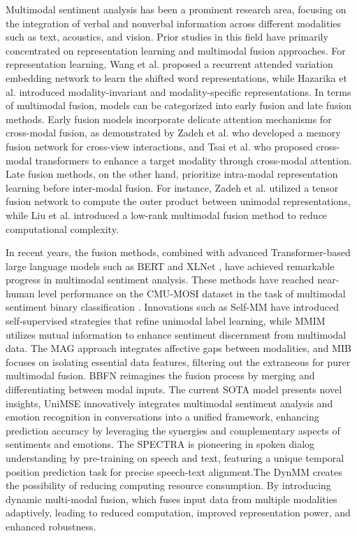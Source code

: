 \documentclass{article} %
\begin{document}
Multimodal sentiment analysis has been a prominent research area, focusing on the integration of verbal and nonverbal information across different modalities such as text, acoustics, and vision. Prior studies in this field have primarily concentrated on representation learning and multimodal fusion approaches. For representation learning, Wang et al. \citep{wang2019words} proposed a recurrent attended variation embedding network to learn the shifted word representations, while Hazarika et al. \citep{hazarika2020misa} introduced modality-invariant and modality-specific representations. In terms of multimodal fusion, models can be categorized into early fusion and late fusion methods. Early fusion models incorporate delicate attention mechanisms for cross-modal fusion, as demonstrated by Zadeh et al. \citep{zadeh2018memory} who developed a memory fusion network for cross-view interactions, and Tsai et al. \citep{tsai2019multimodal} who proposed cross-modal transformers to enhance a target modality through cross-modal attention. Late fusion methods, on the other hand, prioritize intra-modal representation learning before inter-modal fusion. For instance, Zadeh et al. \citep{zadeh2017tensor} utilized a tensor fusion network to compute the outer product between unimodal representations, while Liu et al. \citep{liu2018efficient} introduced a low-rank multimodal fusion method to reduce computational complexity.

In recent years, the fusion methods, combined with advanced Transformer-based large language models such as BERT \citep{devlin2018bert} and XLNet \citep{yang2019xlnet}, have achieved remarkable progress in multimodal sentiment analysis. These methods have reached near-human level performance on the CMU-MOSI dataset in the task of multimodal sentiment binary classification \citep{rahman2020integrating}. Innovations such as Self-MM \citep{yu2021learning} have introduced self-supervised strategies that refine unimodal label learning, while MMIM \citep{han2021improving} utilizes mutual information to enhance sentiment discernment from multimodal data. The MAG approach \citep{rahman2020integrating} integrates affective gaps between modalities, and MIB \citep{mai2022multimodal} focuses on isolating essential data features, filtering out the extraneous for purer multimodal fusion. BBFN \citep{han2021bi} reimagines the fusion process by merging and differentiating between modal inputs. The current SOTA model presents novel insights, UniMSE \citep{hu2022unimse}  innovatively integrates multimodal sentiment analysis and emotion recognition in conversations into a unified framework, enhancing prediction accuracy by leveraging the synergies and complementary aspects of sentiments and emotions. The SPECTRA\citep{yu2023speechtext} is pioneering in spoken dialog understanding by pre-training on speech and text, featuring a unique temporal position prediction task for precise speech-text alignment.The DynMM \citep{Xue_2023_CVPR} creates the possibility of reducing computing resource consumption. By introducing dynamic multi-modal fusion, which fuses input data from multiple modalities adaptively, leading to reduced computation, improved representation power, and enhanced robustness. 
\end{document}
